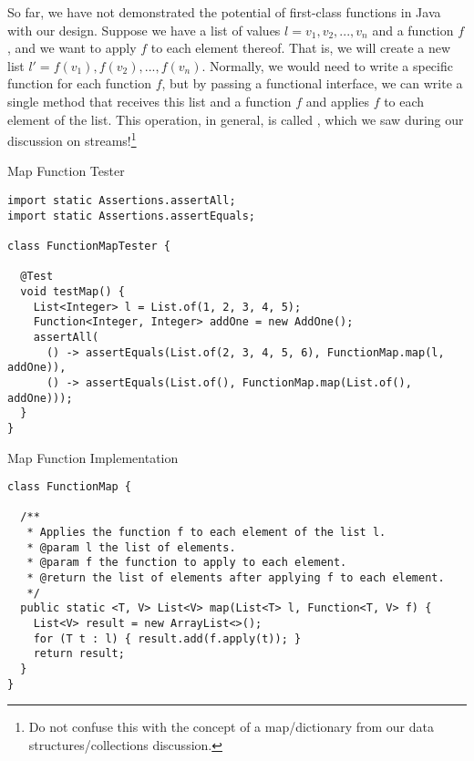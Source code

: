 So far, we have not demonstrated the potential of first-class functions in Java with our design. Suppose we have a list of  values $l=v_1, v_2, ..., v_n$ and a function $f$, and we want to apply $f$ to each element thereof. That is, we will create a new list $l'=f(v_1), f(v_2), ..., f(v_n)$. Normally, we would need to write a specific function for each function $f$, but by passing a functional interface, we can write a single method that receives this list and a function $f$ and applies $f$ to each element of the list. This operation, in general, is called , which we saw during our discussion on streams!\footnote{Do not confuse this with the concept of a map/dictionary from our data structures/collections discussion.}

\begin{cl}[]{Map Function Tester}
\begin{lstlisting}[language=MyJava]
import static Assertions.assertAll;
import static Assertions.assertEquals;

class FunctionMapTester {

  @Test
  void testMap() {
    List<Integer> l = List.of(1, 2, 3, 4, 5);
    Function<Integer, Integer> addOne = new AddOne();
    assertAll(
      () -> assertEquals(List.of(2, 3, 4, 5, 6), FunctionMap.map(l, addOne)),
      () -> assertEquals(List.of(), FunctionMap.map(List.of(), addOne)));
  }
}
\end{lstlisting}
\end{cl}

\begin{cl}[]{Map Function Implementation}
\begin{lstlisting}[language=MyJava]
class FunctionMap {

  /**
   * Applies the function f to each element of the list l.
   * @param l the list of elements.
   * @param f the function to apply to each element.
   * @return the list of elements after applying f to each element.
   */
  public static <T, V> List<V> map(List<T> l, Function<T, V> f) {
    List<V> result = new ArrayList<>();
    for (T t : l) { result.add(f.apply(t)); }
    return result;
  }
}
\end{lstlisting}
\end{cl}


